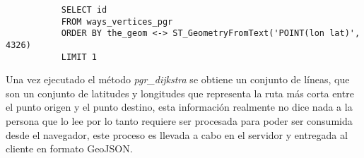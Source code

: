        \begin{verbatim}
           SELECT id
           FROM ways_vertices_pgr
           ORDER BY the_geom <-> ST_GeometryFromText('POINT(lon lat)', 4326)
           LIMIT 1
       \end{verbatim}

       Una vez ejecutado el método \emph{pgr\_dijkstra} se obtiene un conjunto de líneas, que son un conjunto de latitudes y longitudes que representa la ruta más corta entre el punto origen y el punto destino, esta información realmente no dice nada a la persona que lo lee por lo tanto requiere ser procesada para poder ser consumida desde el navegador, este proceso es llevada a cabo en el servidor y entregada al cliente en formato GeoJSON.\\















